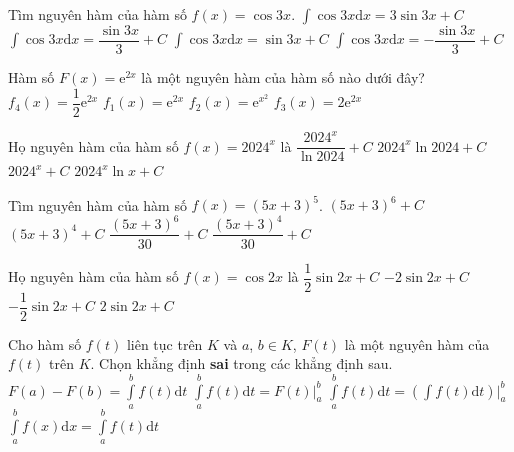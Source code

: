 \begin{ex}%
	Tìm nguyên hàm của hàm số $ f(x)=\cos 3x$.
	\choice
	{ $\displaystyle\int{\cos 3x\mathrm{d}x=3\sin 3x+C}$}
	{\True $\displaystyle\int{\cos 3x\mathrm{d}x=\dfrac{\sin 3x}{3}+C}$}
	{ $\displaystyle\int{\cos 3x\mathrm{d}x=\sin 3x+C}$}
	{$\displaystyle\int{\cos 3x\mathrm{d}x=-\dfrac{\sin 3x}{3}+C}$}
\end{ex}

\begin{ex}%
	Hàm số $F(x)=\mathrm{e}^{2x}$ là một nguyên hàm của hàm số nào dưới đây?
	\choice
	{$f_4(x)=\dfrac{1}{2}\mathrm{e}^{2x}$}
	{$f_1(x)=\mathrm{e}^{2x}$}
	{$f_2(x)=\mathrm{e}^{x^2}$}
	{\True $f_3(x)=2\mathrm{e}^{2x}$}
\end{ex}

\begin{ex}%
	Họ nguyên hàm của hàm số $f(x)=2024^x$ là
	\choice
	{\True $\dfrac{2024^x}{\ln 2024}+C$}
	{$2024^x\ln 2024+C$}
	{$2024^x+C$}
	{$2024^x\ln x+C$}
	\loigiai{

	}
\end{ex}

\begin{ex}%
	Tìm nguyên hàm của hàm số $f(x)=(5x+3)^5$.
	\choice
	{$(5x+3)^6+C$}
	{$(5x+3)^4+C$}
	{\True $\dfrac{(5x+3)^6}{30}+C$}
	{$\dfrac{(5x+3)^4}{30}+C$}
\end{ex}

\begin{ex}%
	Họ nguyên hàm của hàm số $f(x)=\cos 2x$ là
	\choice
	{\True $\dfrac{1}{2} \sin 2x +C$}
	{$-2 \sin 2x +C$}
	{$-\dfrac{1}{2} \sin 2x +C$}
	{$2 \sin 2x +C$}
\end{ex}

\begin{ex}%
	Cho hàm số $f(t)$ liên tục trên $K$ và $a$, $b\in K$, $F(t)$ là một nguyên hàm của $ f(t)$ trên $K$. Chọn khẳng định \textbf{sai} trong các khẳng định sau.
	\choice
	{\True $F(a)-F(b)=\displaystyle\int\limits_a^b f(t)\mathrm{d}t$}
	{$\displaystyle\int\limits_a^bf(t)\mathrm{d}t=F(t)\big|^b_a$}
	{$\displaystyle\int\limits_a^bf(t)\mathrm{d}t=\left(\displaystyle\int f(t)\mathrm{d}t\right)\bigg|^b_a$}
	{$\displaystyle\int\limits_a^bf(x)\mathrm{d}x=\displaystyle\int\limits_a^bf(t)\mathrm{d}t$}
\end{ex}

